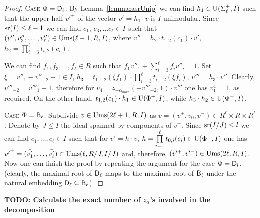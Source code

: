\begin{proof}
\textsc{Case $\Phi=\mathsf{D}_\ell$.} 
By Lemma~\ref{lemma:asrUnip} we can find $h_1\in \operatorname{U}(\Sigma^+_\ell, I)$ such that the upper half $v'^+$ of the vector $v'=h_1\cdot v$ is $I$-unimodular.
Since $\operatorname{sr}(I)\leq \ell-1$ we can find $c_1$, $c_3, \ldots c_\ell \in I$ such that $(v''_1, v''_3, \ldots, v''_\ell) \in \operatorname{Ums}(\ell-1, R, I)$, where
$v''=h_2 \cdot t_{1,2}(c_1) \cdot v'$, $h_2=\prod\limits_{i=3}^\ell t_{i,2}(c_i)$.

We can find $f_1, f_3,\ldots, f_\ell \in R$ such that $f_1v''_1+\sum\limits_{i=3}^\ell f_i v''_{i} = 1$.
Set $\xi = v''_1-v''_{-2}-1 \in I$, $h_3 = t_{1,-2}(\xi f_1) \cdot \prod\limits_{i=3}^\ell t_{i,-2}(\xi f_i)$, $v'''=h_3 \cdot v''$.
Clearly, $v'''_{-2}=v'''_1-1$, therefore for $v_4 = z_{-\alpha_{max}}(-v'''_{-2}, 1) \cdot v'''$ one has $v^4_1 = 1$, as required.
On the other hand, $t_{1,2}(c_1) \cdot h_1 \in \operatorname{U}(\Phi^+, I)$, while $ h_3 \cdot h_2 \in \operatorname{U}(\Phi^-, I)$.

\textsc{Case $\Phi=\mathsf{B}_\ell$:} Subdivide $v\in \operatorname{Ums}(2\ell+1, R, I)$ as $v=(v^+, v_0, v^-)\in R^\ell\times R\times R^\ell$.
Denote by $J\leq I$ the ideal spanned by components of $v^-$.
Since $\operatorname{sr}(I/J)\leq l$ we can find $c_1,\dots,c_\ell\in I$ such that for $v' = h \cdot v$, $h = \prod\limits_{i=1}^\ell t_{0, i}(c_i) \in \operatorname{U}(\Phi^+, I)$
one has $\bar{v'}^+=(\bar{v'_1},\ldots, \bar{v'_\ell}) \in \operatorname{Ums}(\ell, R/J, I/J)$ and, therefore, $(v'^+, v'^-) \in \operatorname{Ums}(2\ell, R, I)$.
Now one can finish the proof by repeating the argument for the case $\Phi=\mathsf{D}_l$.
(clearly, the maximal root of $\mathsf{D}_\ell$ maps to the maximal root of $\mathsf{B}_\ell$ under the natural embedding $\mathsf{D}_\ell\subseteq\mathsf{B}_\ell$). \end{proof}

\begin{rem} %
\textbf{TODO: Calculate the exact number of $z_\alpha$'s involved in the decomposition}
\end{rem}
